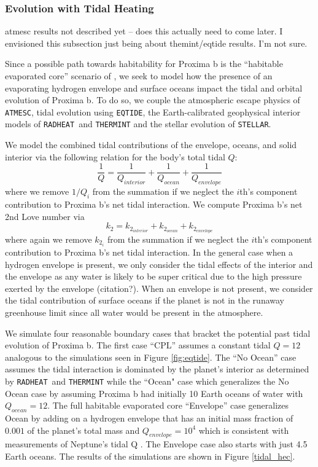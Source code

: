 \documentclass[preprint,12pt]{aastex}
\newcommand{\xxx}[1]{{\color{red} #1}} %
\def\atmesc{\texttt{\footnotesize{ATMESC}}\xspace}
\def\eqtide{\texttt{\footnotesize{EQTIDE}}\xspace}
\def\radheat{\texttt{\footnotesize{RADHEAT}}\xspace}
\def\thermint{\texttt{\footnotesize{THERMINT}}\xspace}
\def\stellar{\texttt{\footnotesize{STELLAR}}\xspace}
\begin{document}
\subsubsection{Evolution with Tidal Heating}
\label{sec:results:internal:tides}

\xxx{atmesc results not described yet -- does this actually need to come later. I envisioned this subsection just being about themint/eqtide results. I'm not sure.}

Since a possible path towards habitability for Proxima b is the
``habitable evaporated core'' scenario of \citet{Luger15}, we seek to
model how the presence of an evaporating hydrogen envelope and surface
oceans impact the tidal and orbital evolution of Proxima b.  To do so,
we couple the atmospheric escape physics of \atmesc, tidal evolution
using \eqtide, the Earth-calibrated geophysical interior models of
\radheat \ and \thermint and the stellar evolution of \stellar.

We model the combined tidal contributions of the envelope, oceans, and solid interior via the following relation for the body's total tidal $Q$:
\begin{equation}
\label{eqn:Q_hec}
\frac{1}{Q} = \frac{1}{Q_{interior}} + \frac{1}{Q_{ocean}} +
\frac{1}{Q_{envelope}}
\end{equation}
where we remove $1/Q_i$ from the summation if we neglect the $i$th's
component contribution to Proxima b's net tidal interaction.  We
compute Proxima b's net 2nd Love number via
\begin{equation}
\label{eqn:k2_hec}
k_2 = k_{2_{interior}} + k_{2_{ocean}}+ k_{2_{envelope}}
\end{equation}
where again we remove $k_{2_{i}}$ from the summation if we neglect the
$i$th's component contribution to Proxima b's net tidal interaction.
In the general case when a hydrogen envelope is present, we only
consider the tidal effects of the interior and the envelope as any
water is likely to be super critical due to the high pressure exerted
by the envelope \xxx{(citation?)}.  When an envelope is not present,
we consider the tidal contribution of surface oceans if the planet is
not in the runaway greenhouse limit since all water would be present
in the atmosphere.

We simulate four reasonable boundary cases that bracket the potential
past tidal evolution of Proxima b.  The first case ``CPL'' assumes a
constant tidal $Q = 12$ analogous to the simulations seen in Figure
\ref{fig:eqtide}.  The ``No Ocean'' case assumes the tidal interaction
is dominated by the planet's interior as determined by \radheat \ and
\thermint while the ``Ocean" case which generalizes the No Ocean case
by assuming Proxima b had initially 10 Earth oceans of water with
$Q_{ocean} = 12$.  The full habitable evaporated core ``Envelope''
case generalizes Ocean by adding on a hydrogen envelope that has an
initial mass fraction of $0.001$ of the planet's total mass and
$Q_{envelope} = 10^4$ which is consistent with measurements of
Neptune's tidal Q \citep{ZhangHamilton08}.  The Envelope case also
starts with just 4.5 Earth oceans.  The results of the simulations are
shown in Figure \ref{tidal_hec}.
\end{document}

